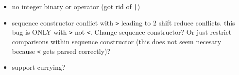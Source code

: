 \documentclass[11pt]{article}
\begin{document}
\begin{itemize}
\item no integer binary or operator (got rid of \verb"|")

\item sequence constructor conflict with \verb">" leading to 2 shift reduce conflicts. this bug is ONLY with \verb">" not \verb"<". Change sequence constructor? Or just restrict comparisons within sequence constructor (this does not seem necesary because \verb"<" gets parsed correctly)?

\item support currying?
\end{itemize}
\end{document}
